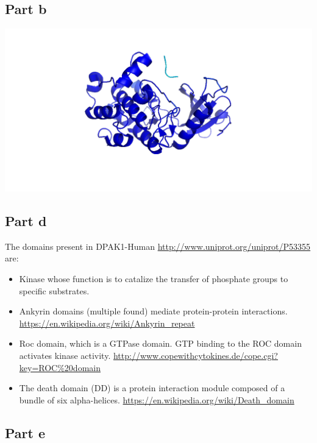 \documentclass[11pt, a4paper,titlepage]{article}
\begin{document}
\subsection{Part b}
\includegraphics[width=15cm]{./Figures/5c.png}

\subsection{Part d}
The domains present in DPAK1-Human
\url{http://www.uniprot.org/uniprot/P53355} are:

\begin{itemize}
\item Kinase whose function is to catalize the transfer of phosphate
  groups to specific substrates.
\item Ankyrin domains (multiple found) mediate protein-protein
  interactions.
  \url{https://en.wikipedia.org/wiki/Ankyrin_repeat}
\item Roc domain, which is a GTPase domain. GTP binding to the ROC
  domain activates kinase activity.
  \url{http://www.copewithcytokines.de/cope.cgi?key=ROC%20domain} 
\item The death domain (DD) is a protein interaction module composed
  of a bundle of six alpha-helices.
  \url{https://en.wikipedia.org/wiki/Death_domain}
\end{itemize}
\subsection{Part e}


\end{document}
